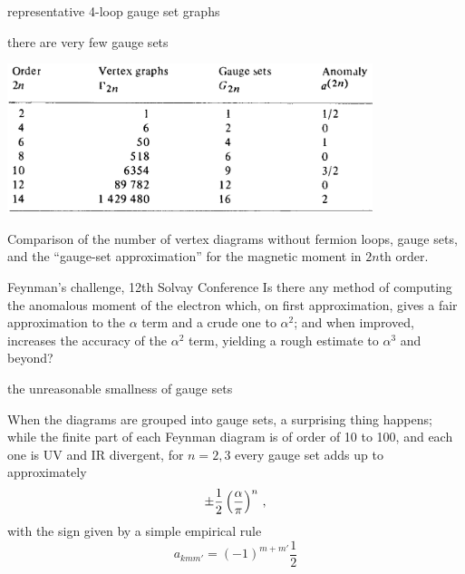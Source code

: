 \begin{frame}{representative 4-loop gauge set graphs}

\end{frame}

\begin{frame}{there are very few gauge sets}
\begin{center}
\includegraphics[width=0.80\textwidth]{../../figs/Cvit77bTab1}
\end{center}
{\scriptsize  %
Comparison of the number of vertex diagrams without fermion loops, gauge
sets, and the ``gauge-set approximation'' for the magnetic
moment in $2n$th order.
}
\end{frame}

\begin{frame}{Feynman's challenge, 12th Solvay Conference}
Is there any method of computing the anomalous moment of the
electron which, on first approximation, gives a fair approximation to the
$\alpha$ term and a crude one to $\alpha^2$; and when improved, increases
the accuracy of the $\alpha^2$ term, yielding a rough estimate to
$\alpha^3$ and beyond?
\end{frame}

\begin{frame}{the unreasonable smallness of gauge sets}

When the diagrams are grouped into
gauge sets,
a surprising thing happens; while the
finite part of each Feynman diagram is of order of 10 to 100,
and each one is UV and IR divergent, for $n=2,3$
every gauge set adds up to approximately
\[
		   \pm {1 \over 2} \left(\frac{\alpha}{\pi}\right)^n
\,,
\]
with the sign given by a simple empirical rule
\[
a_{kmm'} = (-1)^{m+m'}\frac{1}{2}
\] %
\end{frame}


